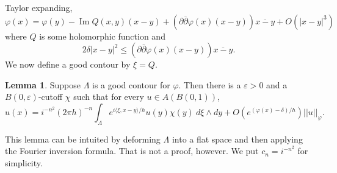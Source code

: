 \documentclass[12pt]{report}
\newcommand{\dbar}{\overline \partial}
\renewcommand{\Im}{\operatorname{Im}}
\theoremstyle{definition}
\newtheorem{lemma}[theorem]{Lemma}
\begin{document}
    Taylor expanding,
    $$\varphi(x) = \varphi(y) - \Im Q(x, y)(x - y) + (\partial\dbar\varphi(x)(x-y))\overline{x - y} + O(|x - y|^3)$$
    where $Q$ is some holomorphic function and 
    $$2\delta |x - y|^2 \leq (\partial\dbar\varphi(x)(x-y))\overline{x-y}.$$
    We now define a good contour by $\xi = Q$.
\begin{lemma}
    Suppose $\Lambda$ is a good contour for $\varphi$. Then there is a $\varepsilon > 0$ and a $B(0, \varepsilon)$-cutoff $\chi$ such that for every $u \in A(B(0, 1))$,
    $$u(x) = i^{-n^2}(2\pi h)^{-n} \int_\Lambda e^{i\langle \xi, x - y\rangle/h} u(y) \chi(y) ~d\xi \wedge dy + O(e^{(\varphi(x) - \delta)/h})||u||_\varphi.$$
\end{lemma}
    This lemma can be intuited by deforming $\Lambda$ into a flat space and then applying the Fourier inversion formula. That is not a proof, however. We put $c_n = i^{-n^2}$ for simplicity.
\end{document}
